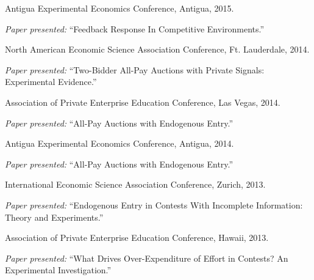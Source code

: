 \documentclass{article}%
\renewenvironment{itemize}{
\begin{list}{}{
\setlength{\leftmargin}{1.5em}
}
}{
\end{list}
}
\begin{document}
\begin{itemize}
\item Antigua Experimental Economics Conference, Antigua, 2015.
\begin{itemize}\vspace{-.24cm}
\item \textit{Paper presented:} ``Feedback Response In Competitive Environments.''
\end{itemize}

\item North American Economic Science Association Conference, Ft. Lauderdale, 2014.
\begin{itemize}\vspace{-.24cm}
\item \textit{Paper presented:} ``Two-Bidder All-Pay Auctions with Private Signals: Experimental Evidence.''
\end{itemize}

\item Association of Private Enterprise Education Conference, Las Vegas, 2014.
\begin{itemize}\vspace{-.24cm}
\item \textit{Paper presented:} ``All-Pay Auctions with Endogenous Entry.''
\end{itemize}

\item Antigua Experimental Economics Conference, Antigua, 2014.
\begin{itemize}\vspace{-.24cm}
\item \textit{Paper presented:} ``All-Pay Auctions with Endogenous Entry.''
\end{itemize}

\item International Economic Science Association Conference, Zurich, 2013.
\begin{itemize}\vspace{-.24cm}
\item \textit{Paper presented:} ``Endogenous Entry in Contests With Incomplete Information: Theory and Experiments.''
\end{itemize}

\item Association of Private Enterprise Education Conference, Hawaii, 2013.
\begin{itemize}\vspace{-.24cm}
\item \textit{Paper presented:} ``What Drives Over-Expenditure of Effort in Contests? An Experimental Investigation.''
\end{itemize}


\end{itemize}
\end{document}
